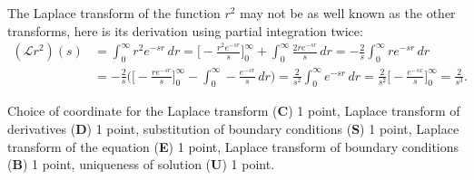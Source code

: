 \begin{diskussion}
The Laplace transform of the function $r^2$ may not be as well known
as the other transforms, here is its derivation using partial
integration twice:
\begin{align*}
(\mathscr{L}r^2)(s)
&=
\int_0^{\infty} r^2e^{-sr}\,dr
=
\biggl[
-\frac{r^2e^{-sr}}{s}
\biggr]_0^\infty
+
\int_0^\infty
\frac{2re^{-sr}}{s}
\,dr
=
-\frac{2}{s}
\int_0^\infty
re^{-sr}\,dr
\\
&=
-\frac{2}{s}
\biggl(
\biggl[
-
\frac{re^{-sr}}{s}
\biggr]_0^\infty
-
\int_0^\infty
-
\frac{e^{-sr}}{s}
\,dr
\biggr)
=
\frac{2}{s^2}
\int_0^\infty e^{-sr}\,dr
=
\frac{2}{s^2}
\biggl[ -\frac{e^{-sx}}{s}\biggr]_0^\infty
=
\frac{2}{s^3}.
\end{align*}
\end{diskussion}

\begin{bewertung}
Choice of coordinate for the Laplace transform ({\bf C}) 1 point,
Laplace transform of derivatives ({\bf D}) 1 point,
substitution of boundary conditions ({\bf S}) 1 point,
Laplace transform of the equation ({\bf E}) 1 point,
Laplace transform of boundary conditions ({\bf B}) 1 point,
uniqueness of solution ({\bf U}) 1 point.
\end{bewertung}

